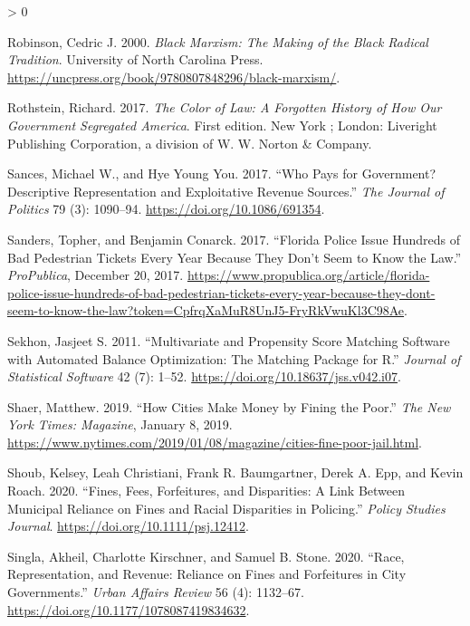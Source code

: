 \documentclass[
  12pt,
]{article}
\newlength{\cslhangindent}
\newenvironment{CSLReferences}[2] %
 {%
  \setlength{\parindent}{0pt}
  \ifodd #1 \everypar{\setlength{\hangindent}{\cslhangindent}}\ignorespaces\fi
  \ifnum #2 > 0
  \setlength{\parskip}{#2\baselineskip}
  \fi
 }%
 {}
\begin{document}
\begin{CSLReferences}{1}{0}
\leavevmode\hypertarget{ref-Robinson2000}{}%
Robinson, Cedric J. 2000. \emph{Black {Marxism}: The {Making} of the {Black Radical Tradition}}. {University of North Carolina Press}. \url{https://uncpress.org/book/9780807848296/black-marxism/}.

\leavevmode\hypertarget{ref-Rothstein2017}{}%
Rothstein, Richard. 2017. \emph{The Color of Law: A Forgotten History of How Our Government Segregated {America}}. First edition. {New York ; London}: {Liveright Publishing Corporation, a division of W. W. Norton \& Company}.

\leavevmode\hypertarget{ref-Sances2017}{}%
Sances, Michael W., and Hye Young You. 2017. {``Who {Pays} for {Government}? {Descriptive Representation} and {Exploitative Revenue Sources}.''} \emph{The Journal of Politics} 79 (3): 1090--94. \url{https://doi.org/10.1086/691354}.

\leavevmode\hypertarget{ref-Sanders2017}{}%
Sanders, Topher, and Benjamin Conarck. 2017. {``Florida {Police Issue Hundreds} of {Bad Pedestrian Tickets Every Year Because They Don}'t {Seem} to {Know} the {Law}.''} \emph{ProPublica}, December 20, 2017. \url{https://www.propublica.org/article/florida-police-issue-hundreds-of-bad-pedestrian-tickets-every-year-because-they-dont-seem-to-know-the-law?token=CpfrqXaMuR8UnJ5-FryRkVwuKl3C98Ae}.

\leavevmode\hypertarget{ref-Sekhon2011}{}%
Sekhon, Jasjeet S. 2011. {``Multivariate and {Propensity Score Matching Software} with {Automated Balance Optimization}: {The Matching} Package for {R}.''} \emph{Journal of Statistical Software} 42 (7): 1--52. \url{https://doi.org/10.18637/jss.v042.i07}.

\leavevmode\hypertarget{ref-Shaer2019}{}%
Shaer, Matthew. 2019. {``How {Cities Make Money} by {Fining} the {Poor}.''} \emph{The New York Times: Magazine}, January 8, 2019. \url{https://www.nytimes.com/2019/01/08/magazine/cities-fine-poor-jail.html}.

\leavevmode\hypertarget{ref-Shoub2020}{}%
Shoub, Kelsey, Leah Christiani, Frank R. Baumgartner, Derek A. Epp, and Kevin Roach. 2020. {``Fines, {Fees}, {Forfeitures}, and {Disparities}: {A Link Between Municipal Reliance} on {Fines} and {Racial Disparities} in {Policing}.''} \emph{Policy Studies Journal}. \url{https://doi.org/10.1111/psj.12412}.

\leavevmode\hypertarget{ref-Singla2020}{}%
Singla, Akheil, Charlotte Kirschner, and Samuel B. Stone. 2020. {``Race, {Representation}, and {Revenue}: {Reliance} on {Fines} and {Forfeitures} in {City Governments}.''} \emph{Urban Affairs Review} 56 (4): 1132--67. \url{https://doi.org/10.1177/1078087419834632}.


\end{CSLReferences}
\end{document}

